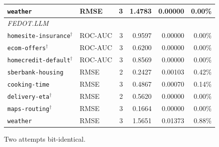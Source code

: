 \begin{table}[t]
\begin{tabular}{llrrrr}
\texttt{weather} & RMSE & 3 & 1.4783 & 0.00000 & 0.00\% \\
\midrule
\multicolumn{6}{l}{\itshape FEDOT.LLM} \\
\texttt{homesite-insurance}$^{\dagger}$ & ROC-AUC & 3 & 0.9597 & 0.00000 & 0.00\% \\
\texttt{ecom-offers}$^{\dagger}$ & ROC-AUC & 3 & 0.6200 & 0.00000 & 0.00\% \\
\texttt{homecredit-default}$^{\dagger}$ & ROC-AUC & 3 & 0.8569 & 0.00000 & 0.00\% \\
\texttt{sberbank-housing} & RMSE & 2 & 0.2427 & 0.00103 & 0.42\% \\
\texttt{cooking-time} & RMSE & 3 & 0.4867 & 0.00070 & 0.14\% \\
\texttt{delivery-eta}$^{\dagger}$ & RMSE & 2 & 0.5620 & 0.00000 & 0.00\% \\
\texttt{maps-routing}$^{\dagger}$ & RMSE & 3 & 0.1664 & 0.00000 & 0.00\% \\
\texttt{weather} & RMSE & 3 & 1.5651 & 0.01373 & 0.88\% \\
\bottomrule
\end{tabular}
\begin{tablenotes}\footnotesize
\item[$\dagger$] Two attempts bit-identical.
\end{tablenotes}
\end{table}
